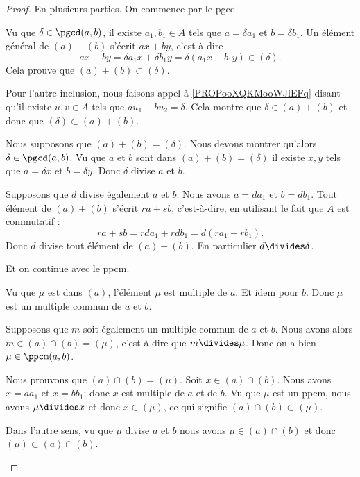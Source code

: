 \begin{proof}
	En plusieurs parties. On commence par le pgcd.
	\begin{subproof}
		Vu que \( \delta\in \pgcd(a,b)\), il existe \( a_1,b_1\in A\) tels que \( a=\delta a_1\) et \( b=\delta b_1\). Un élément général de \( (a)+(b)\) s'écrit \( ax+by\), c'est-à-dire
		\begin{equation}
			ax+by=\delta a_1x+\delta b_1y=\delta(a_1x+b_1y)\in (\delta).
		\end{equation}
		Cela prouve que \( (a)+(b)\subset(\delta)\).

		Pour l'autre inclusion, nous faisons appel à \ref{PROPooXQKMooWJlEFq} disant qu'il existe \( u,v\in A\) tels que \( au_1+bu_2=\delta\). Cela montre que \( \delta\in (a)+(b)\) et donc que \( (\delta)\subset (a)+(b)\).

		\spitem[Si \( (a)+(b)=(\delta)\)]
		Nous supposons que \( (a)+(b)=(\delta)\). Nous devons montrer qu'alors \( \delta\in\pgcd(a,b)\). Vu que \( a\) et \( b\) sont dans \( (a)+(b)=(\delta)\) il existe \( x,y\) tels que \( a=\delta x\) et \( b=\delta y\). Donc \( \delta\) divise \( a\) et \( b\).

		Supposons que \( d\) divise également \( a\) et \( b\). Nous avons \( a=da_1\) et \( b=db_1\). Tout élément de \( (a)+(b)\) s'écrit \( ra+sb\), c'est-à-dire, en utilisant le fait que \( A\) est commutatif :
		\begin{equation}
			ra+sb=rda_1+rdb_1=d(ra_1+rb_1).
		\end{equation}
		Donc \( d\) divise tout élément de \( (a)+(b)\). En particulier \( d\divides \delta\).
	\end{subproof}

	Et on continue avec le ppcm.
	\begin{subproof}
		\spitem[Si \( (a)\cap (b)=(\mu)\)]
		Vu que \( \mu\) est dans \( (a)\), l'élément \( \mu\) est multiple de \( a\). Et idem pour \( b\). Donc \( \mu\) est un multiple commun de \( a\) et \( b\).

		Supposons que \( m\) soit également un multiple commun de \( a\) et \( b\). Nous avons alors \( m\in(a)\cap(b)=(\mu)\), c'est-à-dire que \( m\divides \mu\). Donc on a bien \( \mu\in\ppcm(a,b)\).

		\spitem[Si \( \mu\in \ppcm(a,b)\)]
		Nous prouvons que \( (a)\cap(b)=(\mu)\). Soit \( x\in (a)\cap (b)\). Nous avons \( x=aa_1\) et \( x=bb_1\); donc \( x\) est multiple de \( a\) et de \( b\). Vu que \( \mu\) est un ppcm, nous avons \( \mu\divides x\) et donc \( x\in (\mu)\), ce qui signifie \( (a)\cap(b)\subset(\mu)\).

		Dans l'autre sens, vu que \( \mu\) divise \( a\) et \( b\) nous avons \( \mu\in(a)\cap (b)\) et donc \( (\mu)\subset (a)\cap (b)\).
	\end{subproof}
\end{proof}



